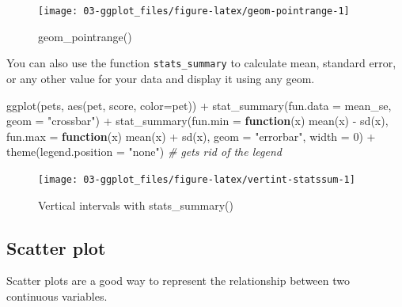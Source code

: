 \documentclass[
  oneside]{book}
\newenvironment{Shaded}{\begin{snugshade}}{\end{snugshade}}
\newcommand{\AttributeTok}[1]{\textcolor[rgb]{0.77,0.63,0.00}{#1}}
\newcommand{\CommentTok}[1]{\textcolor[rgb]{0.56,0.35,0.01}{\textit{#1}}}
\newcommand{\ControlFlowTok}[1]{\textcolor[rgb]{0.13,0.29,0.53}{\textbf{#1}}}
\newcommand{\DecValTok}[1]{\textcolor[rgb]{0.00,0.00,0.81}{#1}}
\newcommand{\FunctionTok}[1]{\textcolor[rgb]{0.00,0.00,0.00}{#1}}
\newcommand{\NormalTok}[1]{#1}
\newcommand{\SpecialCharTok}[1]{\textcolor[rgb]{0.00,0.00,0.00}{#1}}
\newcommand{\StringTok}[1]{\textcolor[rgb]{0.31,0.60,0.02}{#1}}
\begin{document}
\begin{figure}

{\centering \texttt{[image: 03-ggplot\_files/figure-latex/geom-pointrange-1]} 

}

\caption{geom_pointrange()}\label{fig:geom-pointrange}
\end{figure}

You can also use the function \texttt{stats\_summary} to calculate mean, standard error, or any other value for your data and display it using any geom.

\begin{Shaded}
\begin{Highlighting}[]
\FunctionTok{ggplot}\NormalTok{(pets, }\FunctionTok{aes}\NormalTok{(pet, score, }\AttributeTok{color=}\NormalTok{pet)) }\SpecialCharTok{+}
  \FunctionTok{stat\_summary}\NormalTok{(}\AttributeTok{fun.data =}\NormalTok{ mean\_se, }\AttributeTok{geom =} \StringTok{"crossbar"}\NormalTok{) }\SpecialCharTok{+}
  \FunctionTok{stat\_summary}\NormalTok{(}\AttributeTok{fun.min =} \ControlFlowTok{function}\NormalTok{(x) }\FunctionTok{mean}\NormalTok{(x) }\SpecialCharTok{{-}} \FunctionTok{sd}\NormalTok{(x),}
               \AttributeTok{fun.max =} \ControlFlowTok{function}\NormalTok{(x) }\FunctionTok{mean}\NormalTok{(x) }\SpecialCharTok{+} \FunctionTok{sd}\NormalTok{(x),}
               \AttributeTok{geom =} \StringTok{"errorbar"}\NormalTok{, }\AttributeTok{width =} \DecValTok{0}\NormalTok{) }\SpecialCharTok{+}
  \FunctionTok{theme}\NormalTok{(}\AttributeTok{legend.position =} \StringTok{"none"}\NormalTok{) }\CommentTok{\# gets rid of the legend}
\end{Highlighting}
\end{Shaded}

\begin{figure}

{\centering \texttt{[image: 03-ggplot\_files/figure-latex/vertint-statssum-1]} 

}

\caption{Vertical intervals with stats_summary()}\label{fig:vertint-statssum}
\end{figure}

\hypertarget{geom_point}{%
\subsection{Scatter plot}\label{geom_point}}

Scatter plots are a good way to represent the relationship between two continuous variables.
\end{document}

